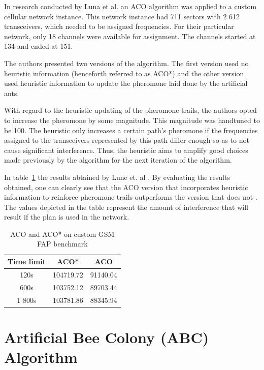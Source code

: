 In research conducted by Luna et al.\cite{ACOvsEA} an ACO algorithm was applied to a custom cellular network instance. This network instance had 711 sectors with 2 612 transceivers, which needed to be assigned frequencies. For their particular network, only 18 channels were available for assignment. The channels started at 134 and ended at 151\cite{ACOvsEA}.

The authors presented two versions of the algorithm. The first version used no heuristic information (henceforth referred to as ACO*) and the other version used heuristic information to update the pheromone laid done by the artificial ants\cite{ACOvsEA}.

With regard to the heuristic updating of the pheromone trails, the authors opted to increase the pheromone by some magnitude\cite{ACOvsEA}. This magnitude was handtuned to be 100. The heuristic only increases a certain path's pheromone if the frequencies assigned to the transceivers represented by this path differ enough so as to not cause significant interference\cite{ACOvsEA}. Thus, the heuristic aims to amplify good choices made previously by the algorithm for the next iteration of the algorithm.

In table~\ref{tab:ACO} the results abtained by Lune et. al \cite{ACOvsEA}. By evaluating the results obtained, one can clearly see that the ACO version that incorporates heuristic information to reinforce pheromone trails outperforms the version that does not \cite{ACOvsEA}. The values depicted in the table represent the amount of interference that will result if the plan is used in the network\cite{ACOvsEA}.
\begin{table}
\centering
	\begin{tabular}{| c | c | c |}
	\hline
	Time limit & ACO* & ACO \\ \hline
	120s & 104719.72 & 91140.04 \\ \hline
	600s & 103752.12 & 89703.44 \\ \hline
	1 800s & 103781.86 & 88345.94 \\ \hline
	\end{tabular}
\caption{ACO and ACO* on custom GSM FAP benchmark\cite{ACOvsEA}}
\label{tab:ACO}
\end{table}

\section{Artificial Bee Colony (ABC) Algorithm}
\label{sec:BEE}

